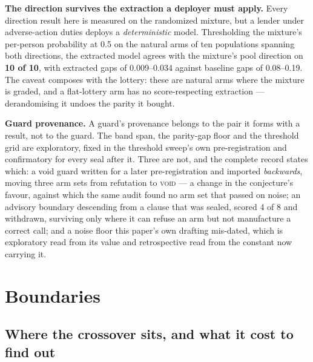 \documentclass[conference]{IEEEtran}
\begin{document}
\textbf{The direction survives the extraction a deployer must apply.} Every direction result
here is measured on the randomized mixture, but a lender under adverse-action duties deploys a
\emph{deterministic} model. Thresholding the mixture's per-person probability at 0.5 on the
natural arms of ten populations spanning both directions, the extracted model agrees with the
mixture's pool direction on \textbf{10 of 10}, with extracted gaps of 0.009--0.034 against
baseline gaps of 0.08--0.19. The caveat composes with the lottery: these are natural arms
where the mixture is graded, and a flat-lottery arm has no score-respecting extraction ---
derandomising it undoes the parity it bought.

\textbf{Guard provenance.} A guard's provenance belongs to the pair it forms with a result,
not to the guard. The band span, the parity-gap floor and the threshold grid are exploratory,
fixed in the threshold sweep's own pre-registration and confirmatory for every seal after it.
Three are not, and the complete record states which: a void guard written for a later
pre-registration and imported \emph{backwards}, moving three arm sets from refutation to
\textsc{void} --- a change in the conjecture's favour, against which the same audit found no
arm set that passed on noise; an advisory boundary descending from a clause that was sealed,
scored 4 of 8 and withdrawn, surviving only where it can refuse an arm but not manufacture a
correct call; and a noise floor this paper's own drafting mis-dated, which is exploratory read
from its value and retrospective read from the constant now carrying it.

\section{Boundaries}
\label{sec:boundaries}

\subsection{Where the crossover sits, and what it cost to find out}
\end{document}
